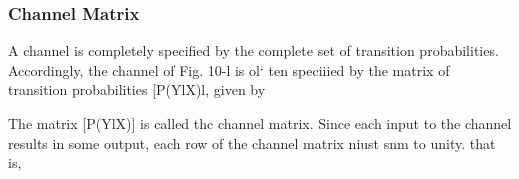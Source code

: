\begin{frame}
\frametitle{ Channel Matrix}

A channel is completely specified by the complete set of transition probabilities. Accordingly, the
channel of Fig. 10-l is ol` ten speciiied by the matrix of transition probabilities [P(YlX)l, given by

The matrix [P(YlX)] is called thc channel matrix. Since each input to the channel results in some
output, each row of the channel matrix niust snm to unity. that is,
 \end{frame}


